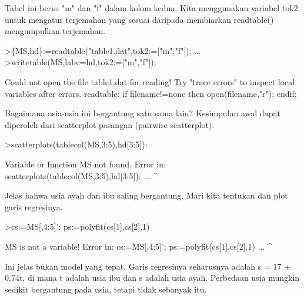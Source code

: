 \documentclass[a4paper,10pt]{article}
\begin{document}
\begin{eulernotebook}
\begin{eulercomment}
Tabel ini berisi "m" dan "f" dalam kolom kedua. Kita menggunakan
variabel tok2 untuk mengatur terjemahan yang sesuai daripada
membiarkan readtable() mengumpulkan terjemahan.
\end{eulercomment}
\begin{eulerprompt}
>\{MS,hd\}:=readtable("table1.dat",tok2:=["m","f"]);  ...
>writetable(MS,labc=hd,tok2:=["m","f"]);
\end{eulerprompt}
\begin{euleroutput}
  Could not open the file
  table1.dat
  for reading!
  Try "trace errors" to inspect local variables after errors.
  readtable:
      if filename!=none then open(filename,"r"); endif;
\end{euleroutput}
\begin{eulercomment}
Bagaimana usia-usia ini bergantung satu sama lain? Kesimpulan awal
dapat diperoleh dari scatterplot pasangan (pairwise scatterplot).
\end{eulercomment}
\begin{eulerprompt}
>scatterplots(tablecol(MS,3:5),hd[3:5]):
\end{eulerprompt}
\begin{euleroutput}
  Variable or function MS not found.
  Error in:
  scatterplots(tablecol(MS,3:5),hd[3:5]): ...
                          ^
\end{euleroutput}
\begin{eulercomment}
Jelas bahwa usia ayah dan ibu saling bergantung. Mari kita tentukan
dan plot garis regresinya.
\end{eulercomment}
\begin{eulerprompt}
>cs:=MS[,4:5]'; ps:=polyfit(cs[1],cs[2],1)
\end{eulerprompt}
\begin{euleroutput}
  MS is not a variable!
  Error in:
  cs:=MS[,4:5]'; ps:=polyfit(cs[1],cs[2],1) ...
              ^
\end{euleroutput}
\begin{eulercomment}
Ini jelas bukan model yang tepat. Garis regresinya seharusnya adalah s
= 17 + 0.74t, di mana t adalah usia ibu dan s adalah usia ayah.
Perbedaan usia mungkin sedikit bergantung pada usia, tetapi tidak
sebanyak itu.


\end{eulercomment}
\end{eulernotebook}
\end{document}
